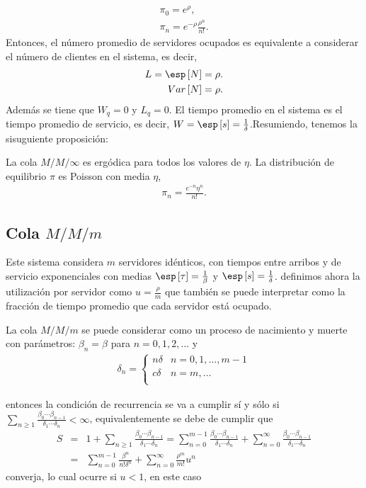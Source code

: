 \begin{eqnarray}\label{MMinf.pi}
\pi_{0}=e^{\rho},\\
\pi_{n}=e^{-\rho}\frac{\rho^{n}}{n!}.
\end{eqnarray}
Entonces, el n\'umero promedio de servidores ocupados es equivalente a considerar el n\'umero de clientes en el  sistema, es decir,
\begin{eqnarray}
L=\esp\left[N\right]=\rho.\\
Var\left[N\right]=\rho.
\end{eqnarray}
Adem\'as se tiene que $W_{q}=0$ y $L_{q}=0$. El tiempo promedio en el sistema es el tiempo promedio de servicio, es decir, $W=\esp\left[s\right]=\frac{1}{\delta}$.Resumiendo, tenemos la sisuguiente proposici\'on:

\begin{Prop}
La cola $M/M/\infty$ es erg\'odica para todos los valores de $\eta$. La distribuci\'on de equilibrio $\pi$ es Poisson con media $\eta$,
\begin{eqnarray}
\pi_{n}=\frac{e^{-n}\eta^{n}}{n!}.
\end{eqnarray}
\end{Prop}
%
\subsection{Cola $M/M/m$}
%

Este sistema considera $m$ servidores id\'enticos, con tiempos entre arribos y de servicio exponenciales con medias $\esp\left[\tau\right]=\frac{1}{\beta}$ y
$\esp\left[s\right]=\frac{1}{\delta}$. definimos ahora la utilizaci\'on por servidor como $u=\frac{\rho}{m}$ que tambi\'en se puede interpretar como la fracci\'on de tiempo promedio que cada servidor est\'a ocupado.

La cola $M/M/m$ se puede considerar como un proceso de nacimiento y muerte con par\'ametros: $\beta_{n}=\beta$ para $n=0,1,2,\ldots$ y
\begin{eqnarray}
\delta_{n}=\left\{\begin{array}{cc}
n\delta & n=0,1,\ldots,m-1\\
c\delta & n=m,\ldots\\
\end{array}\right.
\end{eqnarray}

entonces  la condici\'on de recurrencia se va a cumplir s\'i y s\'olo si $\sum_{n\geq1}\frac{\beta_{0}\cdots\beta_{n-1}}{\delta_{1}\cdots\delta_{n}}<\infty$,
equivalentemente se debe de cumplir que
\begin{eqnarray*}
S&=&1+\sum_{n\geq1}\frac{\beta_{0}\cdots\beta_{n-1}}{\delta_{1}\cdots\delta_{n}}=\sum_{n=0}^{m-1}\frac{\beta_{0}\cdots\beta_{n-1}}{\delta_{1}\cdots\delta_{n}}+\sum_{n=0}^{\infty}\frac{\beta_{0}\cdots\beta_{n-1}}{\delta_{1}\cdots\delta_{n}}\\
&=&\sum_{n=0}^{m-1}\frac{\beta^{n}}{n!\delta^{n}}+\sum_{n=0}^{\infty}\frac{\rho^{m}}{m!}u^{n}
\end{eqnarray*}
converja, lo cual ocurre si $u<1$, en este caso


